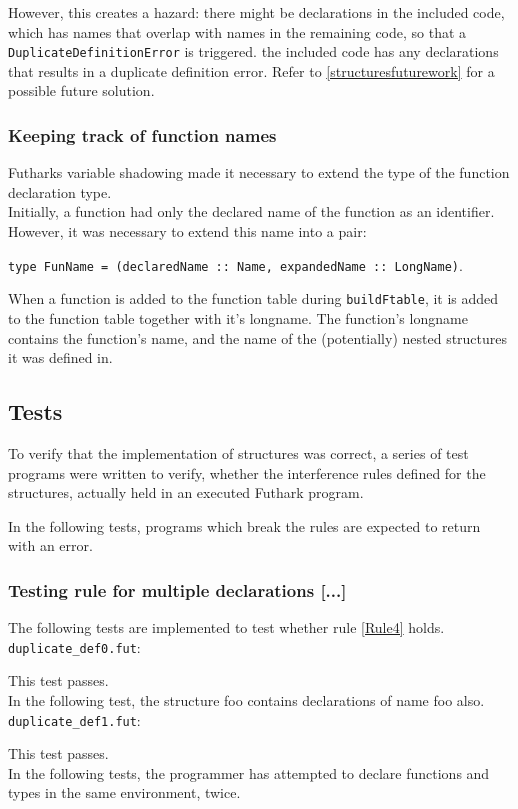 However, this creates a hazard: there might be declarations in the included
code, which has names that overlap with names in the remaining code, so that a
\texttt{DuplicateDefinitionError} is triggered. the included code has any declarations
that results in a duplicate definition error. Refer to
\ref{structuresfuturework} for a possible future solution.

\subsubsection{Keeping track of function names}
Futharks variable shadowing made it necessary to extend the type of the function
declaration type. \\
Initially, a function had only the declared name of the function as an identifier.
However, it was necessary to extend this name into a pair:

\texttt{type FunName = (declaredName :: Name, expandedName :: LongName)}.

When a function is added to the function table during \texttt{buildFtable}, it
is added to the function table together with it's longname. The function's
longname contains the function's name, and the name of the (potentially) nested
structures it was defined in.

\subsection{Tests}
\label{subsec:structuretests}
To verify that the implementation of structures was correct, a series of test
programs were written to verify, whether the interference rules defined for the
structures, actually held in an executed Futhark program.

In the following tests, programs which break the rules are expected to return
with an error.

\subsubsection{Testing rule for multiple declarations [...]}
The following tests are implemented to test whether rule \ref{Rule4} holds.
\texttt{duplicate_def0.fut}:

This test passes.
\\
In the following test, the structure foo contains declarations of name foo also.
\texttt{duplicate_def1.fut}:

This test passes.
\\
In the following tests, the programmer has attempted to declare functions and
types in the same environment, twice.

